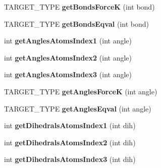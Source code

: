 \begin{DoxyCompactItemize}
\item 
T\+A\+R\+G\+E\+T\+\_\+\+T\+Y\+PE {\bfseries get\+Bonds\+ForceK} (int bond)\hypertarget{classreadAmberInput_a70b006eac9188bb3a582c2ee178e6141}{}\label{classreadAmberInput_a70b006eac9188bb3a582c2ee178e6141}

\item 
T\+A\+R\+G\+E\+T\+\_\+\+T\+Y\+PE {\bfseries get\+Bonds\+Eqval} (int bond)\hypertarget{classreadAmberInput_ab4aa3e248a000003cf50df307adf0e6e}{}\label{classreadAmberInput_ab4aa3e248a000003cf50df307adf0e6e}

\item 
int {\bfseries get\+Angles\+Atoms\+Index1} (int angle)\hypertarget{classreadAmberInput_aa51692a97b0b9fe3e51ba535ae3d6d98}{}\label{classreadAmberInput_aa51692a97b0b9fe3e51ba535ae3d6d98}

\item 
int {\bfseries get\+Angles\+Atoms\+Index2} (int angle)\hypertarget{classreadAmberInput_a87d34bedff17249730cd3772d35c2e63}{}\label{classreadAmberInput_a87d34bedff17249730cd3772d35c2e63}

\item 
int {\bfseries get\+Angles\+Atoms\+Index3} (int angle)\hypertarget{classreadAmberInput_a8832c335a0ed0fbef22f4e03d1ffb552}{}\label{classreadAmberInput_a8832c335a0ed0fbef22f4e03d1ffb552}

\item 
T\+A\+R\+G\+E\+T\+\_\+\+T\+Y\+PE {\bfseries get\+Angles\+ForceK} (int angle)\hypertarget{classreadAmberInput_a746693251bc88cfa17d73293c4bcf7fb}{}\label{classreadAmberInput_a746693251bc88cfa17d73293c4bcf7fb}

\item 
T\+A\+R\+G\+E\+T\+\_\+\+T\+Y\+PE {\bfseries get\+Angles\+Eqval} (int angle)\hypertarget{classreadAmberInput_a35a96637ffe5ac7666e94be0511b8ef9}{}\label{classreadAmberInput_a35a96637ffe5ac7666e94be0511b8ef9}

\item 
int {\bfseries get\+Dihedrals\+Atoms\+Index1} (int dih)\hypertarget{classreadAmberInput_ace35d40ecd1abd049d5478861abd8060}{}\label{classreadAmberInput_ace35d40ecd1abd049d5478861abd8060}

\item 
int {\bfseries get\+Dihedrals\+Atoms\+Index2} (int dih)\hypertarget{classreadAmberInput_aad99a355ec177236fa072226e5c900aa}{}\label{classreadAmberInput_aad99a355ec177236fa072226e5c900aa}

\item 
int {\bfseries get\+Dihedrals\+Atoms\+Index3} (int dih)\hypertarget{classreadAmberInput_a2f5cbba39c088f43b33b82aa5c0621c8}{}\label{classreadAmberInput_a2f5cbba39c088f43b33b82aa5c0621c8}


\end{DoxyCompactItemize}
